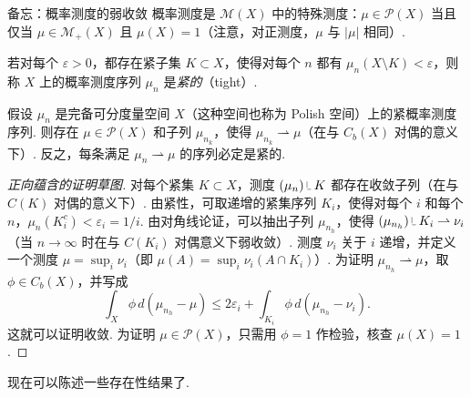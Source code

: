 \begin{sourcebox}{备忘：概率测度的弱收敛}\label{box:1.4}
概率测度是 $\mathscr M(X)$ 中的特殊测度：$\mu\in\mathscr P(X)$ 当且仅当 $\mu\in\mathscr M_+(X)$ 且 $\mu(X)=1$（注意，对正测度，$\mu$ 与 $|\mu|$ 相同）.

\begin{definition*}
若对每个 $\varepsilon>0$，都存在紧子集 $K\subset X$，使得对每个 $n$ 都有 $\mu_n(X\setminus K)<\varepsilon$，则称 $X$ 上的概率测度序列 $\mu_n$ 是\emph{紧的}（tight）.
\end{definition*}

\begin{theorem*}[Prokhorov]
假设 $\mu_n$ 是完备可分度量空间 $X$（这种空间也称为 Polish 空间）上的紧概率测度序列. 则存在 $\mu\in\mathscr P(X)$ 和子列 $\mu_{n_k}$，使得 $\mu_{n_k}\rightharpoonup\mu$（在与 $C_b(X)$ 对偶的意义下）. 反之，每条满足 $\mu_n\rightharpoonup\mu$ 的序列必定是紧的.
\end{theorem*}

\begin{proof}[正向蕴含的证明草图]
对每个紧集 $K\subset X$，测度 $(\mu_n)\mathbin{\vrule height 1.4ex depth -0.3ex width 0.07ex\vrule height 0.07ex depth 0ex width 0.7ex}K$ 都存在收敛子列（在与 $C(K)$ 对偶的意义下）. 由紧性，可取递增的紧集序列 $K_i$，使得对每个 $i$ 和每个 $n$，$\mu_n(K_i^c)<\varepsilon_i=1/i$. 由对角线论证，可以抽出子列 $\mu_{n_h}$，使得 $(\mu_{n_h})\mathbin{\vrule height 1.4ex depth -0.3ex width 0.07ex\vrule height 0.07ex depth 0ex width 0.7ex}K_i\rightharpoonup\nu_i$（当 $n\to\infty$ 时在与 $C(K_i)$ 对偶意义下弱收敛）. 测度 $\nu_i$ 关于 $i$ 递增，并定义一个测度 $\mu=\sup_i\nu_i$（即 $\mu(A)=\sup_i\nu_i(A\cap K_i)$）. 为证明 $\mu_{n_h}\rightharpoonup\mu$，取 $\phi\in C_b(X)$，并写成
\[
\int_X\phi\,d(\mu_{n_h}-\mu)\le 2\varepsilon_i+\int_{K_i}\phi\,d(\mu_{n_h}-\nu_i).
\]
这就可以证明收敛. 为证明 $\mu\in\mathscr P(X)$，只需用 $\phi=1$ 作检验，核查 $\mu(X)=1$.
\end{proof}
\end{sourcebox}

现在可以陈述一些存在性结果了.

